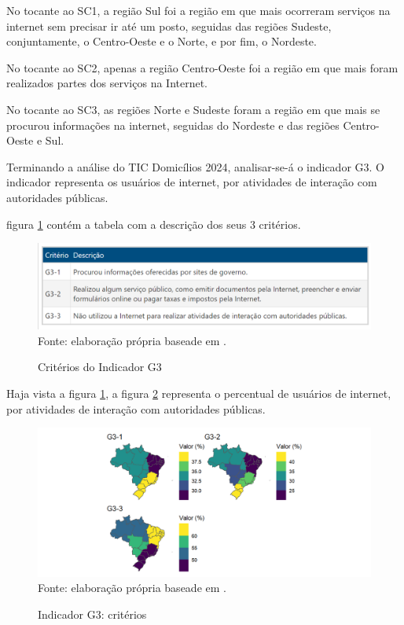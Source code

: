 No tocante ao SC1, a região Sul foi a região em que mais ocorreram serviços na internet sem precisar ir até um posto, seguidas das regiões Sudeste, conjuntamente, o Centro-Oeste e o Norte, e por fim, o Nordeste.

No tocante ao SC2, apenas a região Centro-Oeste foi a região em que mais foram realizados partes dos serviços na Internet.

No tocante ao SC3, as regiões Norte e Sudeste foram a região em que mais se procurou informações na internet, seguidas do Nordeste e das regiões Centro-Oeste e Sul.

Terminando a análise do TIC Domicílios 2024, analisar-se-á o indicador G3. O indicador representa os usuários de internet, por atividades de interação com autoridades públicas.

figura \ref{fig:tabela_tic_domicilios_2024_criterios_g3} contém a tabela com a descrição dos seus 3 critérios.  

\begin{figure}[H]
	\centering
	\caption{Critérios do Indicador G3}
	\includegraphics[width=1\linewidth]{figuras/tabela_tic_domicilios_2024_criterios_g3.png}
	\label{fig:tabela_tic_domicilios_2024_criterios_g3}
	\footnotesize{Fonte: elaboração própria baseade em \cite{tic_domicilios_2024_g3}.}
\end{figure}

Haja vista a figura \ref{fig:tabela_tic_domicilios_2024_criterios_g3}, a figura \ref{fig:mapa_coropletico_tic_domicilios_2024_g3}  representa o percentual de usuários de internet, por atividades de interação com autoridades públicas. 

\begin{figure}[H]
	\centering
	\caption{Indicador G3: critérios}
	\includegraphics[width=1\linewidth]{figuras/mapa_coropletico_tic_domicilios_2024_g3.png}
	\label{fig:mapa_coropletico_tic_domicilios_2024_g3}
	\footnotesize{Fonte: elaboração própria baseade em \cite{tic_domicilios_2024_g3}.}
\end{figure}

